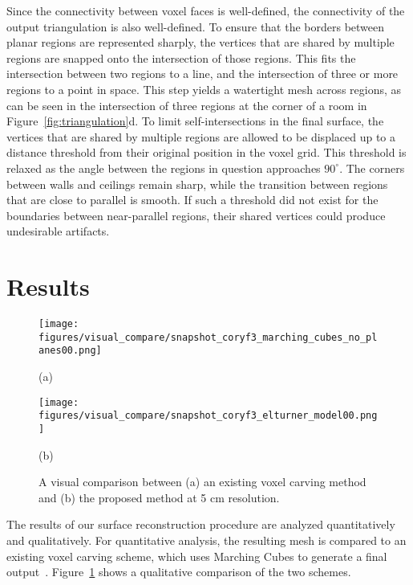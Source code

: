 \documentclass[10pt,twocolumn,letterpaper]{article}
\begin{document}
Since the connectivity between voxel faces is well-defined, the connectivity of the output triangulation is also well-defined.  To ensure that the borders between planar regions are represented sharply, the vertices that are shared by multiple regions are snapped onto the intersection of those regions.  This fits the intersection between two regions to a line, and the intersection of three or more regions to a point in space.  This step yields a watertight mesh across regions, as can be seen in the intersection of three regions at the corner of a room in Figure~\ref{fig:triangulation}d.  To limit self-intersections in the final surface, the vertices that are shared by multiple regions are allowed to be displaced up to a distance threshold from their original position in the voxel grid.  This threshold is relaxed as the angle between the regions in question approaches $90^{\circ}$.  The corners between walls and ceilings remain sharp, while the transition between regions that are close to parallel is smooth.  If such a threshold did not exist for the boundaries between near-parallel regions, their shared vertices could produce undesirable artifacts.

\section{Results}
\label{sec:results}

\begin{figure}[t]

	\begin{minipage}[b]{0.48\linewidth}
	\centerline{\texttt{[image: figures/visual\_compare/snapshot\_coryf3\_marching\_cubes\_no\_planes00.png]}}
	\centerline{(a)}\medskip
	\end{minipage}
	\hfill
	\begin{minipage}[b]{0.48\linewidth}
	\centerline{\texttt{[image: figures/visual\_compare/snapshot\_coryf3\_elturner\_model00.png]}}
	\centerline{(b)}\medskip
	\end{minipage}

	\caption{A visual comparison between (a) an existing voxel carving method~\cite{Carving} and (b) the proposed method at 5 cm resolution.}
	\label{fig:mc_compare}

\end{figure}

The results of our surface reconstruction procedure are analyzed quantitatively and qualitatively.  For quantitative analysis, the resulting mesh is compared to an existing voxel carving scheme, which uses Marching Cubes to generate a final output~\cite{Carving}.  Figure~\ref{fig:mc_compare} shows a qualitative comparison of the two schemes.
\end{document}
